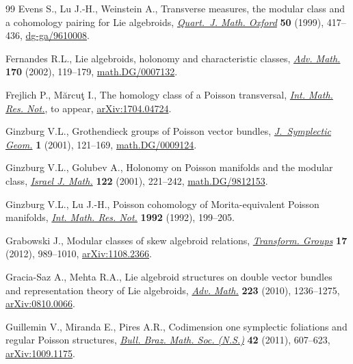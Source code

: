 \documentclass[pdftex]{sigma}
\numberwithin{equation}{section}
\newcommand{\8}{\infty}
\begin{document}
\begin{thebibliography}{99}
Evens S., Lu J.-H., Weinstein A., Transverse measures, the modular class and a
 cohomology pairing for {L}ie algebroids, \href{https://doi.org/10.1093/qjmath/50.200.417}{\textit{Quart.~J. Math. Oxford}}
 \textbf{50} (1999), 417--436, \href{https://arxiv.org/abs/dg-ga/9610008}{dg-ga/9610008}.

Fernandes R.L., Lie algebroids, holonomy and characteristic classes,
 \href{https://doi.org/10.1006/aima.2001.2070}{\textit{Adv. Math.}} \textbf{170} (2002), 119--179, \href{https://arxiv.org/abs/math.DG/0007132}{math.DG/0007132}.

Frejlich P., M\u{a}rcu\c{t} I., The homology class of a {P}oisson transversal,
 \href{https://doi.org/10.1093/imrn/rny105}{\textit{Int. Math. Res. Not.}}, {t}o appear, \href{https://arxiv.org/abs/1704.04724}{arXiv:1704.04724}.

Ginzburg V.L., Grothendieck groups of {P}oisson vector bundles,
 \href{https://doi.org/10.4310/JSG.2001.v1.n1.a4}{\textit{J.~Symplectic Geom.}} \textbf{1} (2001), 121--169,
 \href{https://arxiv.org/abs/math.DG/0009124}{math.DG/0009124}.

Ginzburg V.L., Golubev A., Holonomy on {P}oisson manifolds and the modular
 class, \href{https://doi.org/10.1007/BF02809901}{\textit{Israel J. Math.}} \textbf{122} (2001), 221--242,
 \href{https://arxiv.org/abs/math.DG/9812153}{math.DG/9812153}.

Ginzburg V.L., Lu J.-H., Poisson cohomology of {M}orita-equivalent {P}oisson
 manifolds, \href{https://doi.org/10.1155/S1073792892000229}{\textit{Int. Math. Res. Not.}} \textbf{1992} (1992), 199--205.

Grabowski J., Modular classes of skew algebroid relations, \href{https://doi.org/10.1007/s00031-012-9197-2}{\textit{Transform.
 Groups}} \textbf{17} (2012), 989--1010, \href{https://arxiv.org/abs/1108.2366}{arXiv:1108.2366}.

Gracia-Saz A., Mehta R.A., Lie algebroid structures on double vector bundles
 and representation theory of {L}ie algebroids, \href{https://doi.org/10.1016/j.aim.2009.09.010}{\textit{Adv. Math.}}
 \textbf{223} (2010), 1236--1275, \href{https://arxiv.org/abs/0810.0066}{arXiv:0810.0066}.

Guillemin V., Miranda E., Pires A.R., Codimension one symplectic foliations and
 regular {P}oisson structures, \href{https://doi.org/10.1007/s00574-011-0031-6}{\textit{Bull. Braz. Math. Soc. (N.S.)}}
 \textbf{42} (2011), 607--623, \href{https://arxiv.org/abs/1009.1175}{arXiv:1009.1175}.


\end{thebibliography}
\end{document}
